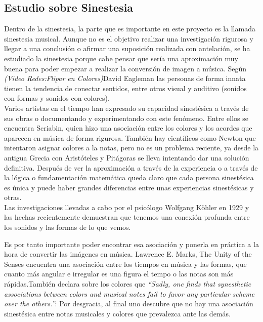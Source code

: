 \subsection{Estudio sobre Sinestesia}
\label{subsubsec:estudioSinestesia}

Dentro de la sinestesia, la parte que es importante en este proyecto es la llamada sinestesia musical. Aunque no es el objetivo realizar una investigación rigurosa y llegar a una conclusión o afirmar una suposición realizada con antelación, se ha estudiado la sinestesia porque cabe pensar que sería una aproximación muy buena para poder empezar a realizar la conversión de imagen a música.
Según \emph{(Video Redes:Flipar en Colores)}David Eagleman las personas de forma innata tienen la tendencia de conectar sentidos, entre otros visual y auditivo (sonidos con formas y sonidos con colores).\\

Varios artistas en el tiempo han expresado su capacidad sinestésica a través de sus obras o documentando y experimentando con este fenómeno. Entre ellos se encuentra Scriabin, quien hizo una asociación entre los colores y los acordes que aparecen en música de forma rigurosa. También hay científicos como Newton que intentaron asignar colores a la notas, pero no es un problema reciente, ya desde la antigua Grecia con Aristóteles y Pitágoras se lleva intentando dar una solución definitiva. Después de ver la aproximación a través de la experiencia o a través de la lógica o fundamentación matemática queda claro que cada persona sinestésica es única y puede haber grandes diferencias entre unas experiencias sinestésicas y otras.\\

Las investigaciones llevadas a cabo por el psicólogo Wolfgang Köhler en 1929 y las hechas recientemente demuestran que tenemos una conexión profunda entre los sonidos y las formas de lo que vemos. 


 Es por tanto importante poder encontrar esa asociación y ponerla en práctica a la hora de convertir las imágenes en música. Lawrence E. Marks, The Unity of the Senses encuentra una asociación entre los tiempos en música y las formas, que cuanto más angular e irregular es una figura el tempo o las notas son más rápidas.También declara sobre los colores que \emph{``Sadly, one finds that synesthetic associations between colors and musical notes fail to favor any particular scheme over the others.''}: Por desgracia, al final uno descubre que no hay una asociación sinestésica entre notas musicales y colores que prevalezca ante las demás.\\

